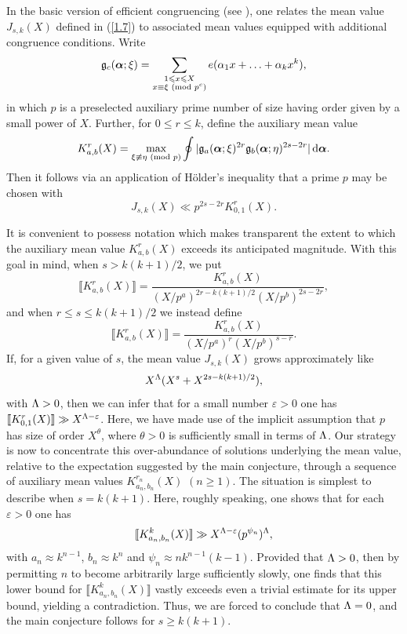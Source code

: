 \documentclass[12pt,reqno]{amsart}
\theoremstyle{definition}
\theoremstyle{remark}
\numberwithin{equation}{section}
\newcommand{\mmod}[1]{\,\,(\text{\rm mod}\,\,#1)}
\def\grg{{\mathfrak g}}\def\grG{{\mathfrak G}}
\def\alp{{\alpha}} \def\bfalp{{\boldsymbol \alpha}}
\def\tet{{\theta}} \def\bftet{{\boldsymbol \theta}}
\def\eps{\varepsilon}
\def\le{\leqslant} \def\ge{\geqslant} \def\pleq{\preccurlyeq} \def\ple{\prec}
\def\d{{\,{\rm d}}}
\begin{document}
In the basic version of efficient congruencing (see \cite{Woo2012}), one relates the mean 
value $J_{s,k}(X)$ defined in (\ref{1.7}) to associated mean values equipped with 
additional congruence conditions. Write
$$\grg_c(\bfalp;\xi)=\sum_{\substack{1\le x\le X\\ x\equiv \xi\mmod{p^c}}}
e(\alp_1x+\ldots +\alp_kx^k),$$
in which $p$ is a preselected auxiliary prime number of size having order given by a small 
power of $X$. Further, for $0\le r\le k$, define the auxiliary mean value
\begin{equation}\label{2.1}
K_{a,b}^r(X)=\max_{\xi\not \equiv \eta\mmod{p}}\oint
|\grg_a(\bfalp;\xi)^{2r}\grg_b(\bfalp;\eta)^{2s-2r}|\d\bfalp .
\end{equation}
Then it follows via an application of H\"older's inequality that a prime $p$ may be chosen 
with 
$$J_{s,k}(X)\ll p^{2s-2r}K_{0,1}^r(X).$$

\par It is convenient to possess notation which makes transparent the extent to which the 
auxiliary mean value $K_{a,b}^r(X)$ exceeds its anticipated magnitude. With this goal in 
mind, when $s>k(k+1)/2$, we put
$$\llbracket K_{a,b}^r(X)\rrbracket =\frac{K_{a,b}^r(X)}{(X/p^a)^{2r-k(k+1)/2}
(X/p^b)^{2s-2r}},$$
and when $r\le s\le k(k+1)/2$ we instead define
$$\llbracket K_{a,b}^r(X)\rrbracket =\frac{K_{a,b}^r(X)}{(X/p^a)^r(X/p^b)^{s-r}}.$$
If, for a given value of $s$, the mean value $J_{s,k}(X)$ grows approximately like
$$X^{\Lambda} (X^s+X^{2s-k(k+1)/2}),$$
with ${\Lambda}>0$, then we can infer that for a small number $\eps>0$ one has 
$\llbracket K_{0,1}^r(X)\rrbracket \gg X^{\Lam-\eps}$. Here, we have made use of the 
implicit assumption that $p$ has size of order $X^\tet$, where $\tet>0$ is sufficiently small 
in terms of ${\Lambda}$. Our strategy is now to concentrate this over-abundance of solutions 
underlying the mean value, relative to the expectation suggested by the main conjecture, 
through a sequence of auxiliary mean values $K_{a_n,b_n}^{r_n}(X)$ $(n\ge 1)$. The 
situation is simplest to describe when $s=k(k+1)$. Here, roughly speaking, one shows that 
for each $\eps>0$ one has
\begin{equation}\label{2.2}
\llbracket K_{a_n,b_n}^k(X)\rrbracket \gg X^{\Lam-\eps}(p^{\psi_n})^\Lam ,
\end{equation}
with $a_n\approx k^{n-1}$, $b_n\approx k^n$ and $\psi_n\approx nk^{n-1}(k-1)$. 
Provided that ${\Lambda}>0$, then by permitting $n$ to become arbitrarily large sufficiently 
slowly, one finds that this lower bound for $\llbracket K_{a_n,b_n}^k(X)\rrbracket$ vastly 
exceeds even a trivial estimate for its upper bound, yielding a contradiction. Thus, we are 
forced to conclude that ${\Lambda}=0$, and the main conjecture follows for $s\ge k(k+1)$.\par
\end{document}
